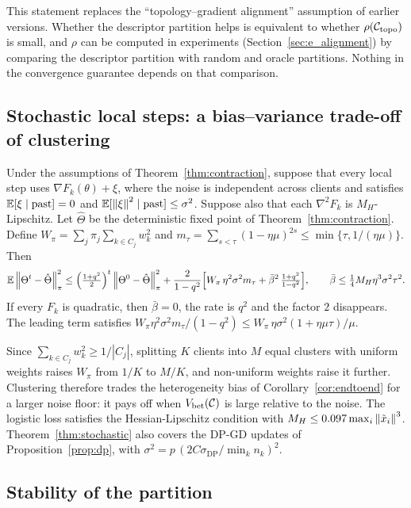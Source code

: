 This statement replaces the ``topology--gradient alignment'' assumption of earlier versions.
Whether the descriptor partition helps is equivalent to whether $\rho(\mathcal{C}_{\mathrm{topo}})$
is small, and $\rho$ can be computed in experiments (Section~\ref{sec:e_alignment}) by
comparing the descriptor partition with random and oracle partitions. Nothing in the
convergence guarantee depends on that comparison.

\subsection{Stochastic local steps: a bias--variance trade-off of clustering}

\begin{theorem}\label{thm:stochastic}
Under the assumptions of Theorem~\ref{thm:contraction}, suppose that every local step uses
$\nabla F_k(\theta)+\xi$, where the noise is independent across clients and satisfies
$\mathbb{E}[\xi\mid\text{past}]=0$ and $\mathbb{E}[\left\lVert \xi \right\rVert^2\mid\text{past}]\le\sigma^2$. Suppose also that
each $\nabla^2F_k$ is $M_H$-Lipschitz. Let $\hat\Theta$ be the deterministic fixed point of
Theorem~\ref{thm:contraction}. Define $W_\pi=\sum_j\pi_j\sum_{k\in C_j}w_k^2$ and
$m_\tau=\sum_{s<\tau}(1-\eta\mu)^{2s}\le\min\{\tau,1/(\eta\mu)\}$. Then
\[
  \mathbb{E}\left\lVert \Theta^t-\hat\Theta \right\rVert_{\pi}^2\le\Bigl(\tfrac{1+q^2}{2}\Bigr)^{t}\left\lVert \Theta^0-\hat\Theta \right\rVert_{\pi}^2
  +\frac{2}{1-q^2}\Bigl[W_\pi\,\eta^2\sigma^2m_\tau+\bar\beta^2\,\tfrac{1+q^2}{1-q^2}\Bigr],
  \qquad\bar\beta\le\tfrac14M_H\eta^3\sigma^2\tau^2 .
\]
If every $F_k$ is quadratic, then $\bar\beta=0$, the rate is $q^2$ and the factor $2$
disappears. The leading term satisfies
$W_\pi\eta^2\sigma^2m_\tau/(1-q^2)\le W_\pi\,\eta\sigma^2(1+\eta\mu\tau)/\mu$.
\end{theorem}

Since $\sum_{k\in C_j}w_k^2\ge1/|C_j|$, splitting $K$ clients into $M$ equal clusters with
uniform weights raises $W_\pi$ from $1/K$ to $M/K$, and non-uniform weights raise it further.
Clustering therefore trades the heterogeneity bias of Corollary~\ref{cor:endtoend} for a
larger noise floor: it pays off when $V_{\mathrm{bet}}(\mathcal{C})$ is large relative to the noise. The
logistic loss satisfies the Hessian-Lipschitz condition with
$M_H\le0.097\max_i\left\lVert \tilde x_i \right\rVert^3$. Theorem~\ref{thm:stochastic} also covers the DP-GD
updates of Proposition~\ref{prop:dp}, with $\sigma^2=p\,(2C\sigma_{\mathrm{DP}}/\min_kn_k)^2$.

\subsection{Stability of the partition}
\label{sec:theory_partition}

